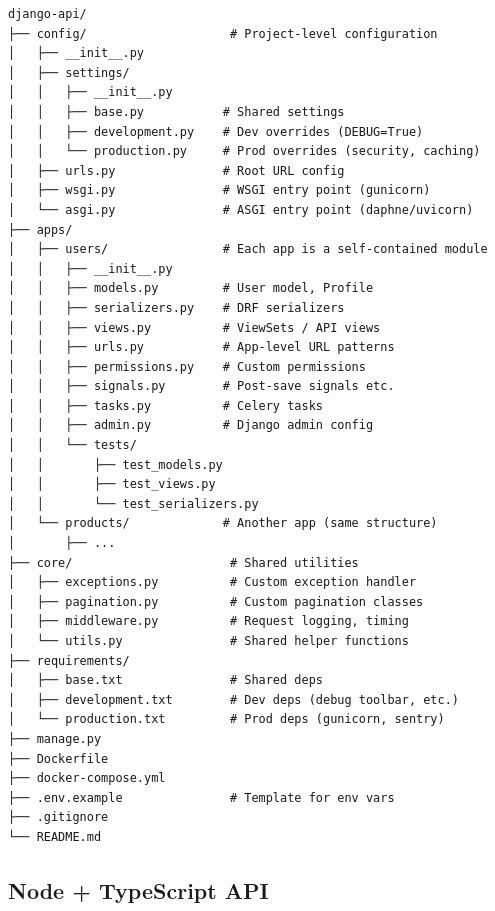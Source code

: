 \documentclass[10pt, a4paper]{article}
\begin{document}
\begin{lstlisting}
django-api/
├── config/                    # Project-level configuration
│   ├── __init__.py
│   ├── settings/
│   │   ├── __init__.py
│   │   ├── base.py           # Shared settings
│   │   ├── development.py    # Dev overrides (DEBUG=True)
│   │   └── production.py     # Prod overrides (security, caching)
│   ├── urls.py               # Root URL config
│   ├── wsgi.py               # WSGI entry point (gunicorn)
│   └── asgi.py               # ASGI entry point (daphne/uvicorn)
├── apps/
│   ├── users/                # Each app is a self-contained module
│   │   ├── __init__.py
│   │   ├── models.py         # User model, Profile
│   │   ├── serializers.py    # DRF serializers
│   │   ├── views.py          # ViewSets / API views
│   │   ├── urls.py           # App-level URL patterns
│   │   ├── permissions.py    # Custom permissions
│   │   ├── signals.py        # Post-save signals etc.
│   │   ├── tasks.py          # Celery tasks
│   │   ├── admin.py          # Django admin config
│   │   └── tests/
│   │       ├── test_models.py
│   │       ├── test_views.py
│   │       └── test_serializers.py
│   └── products/             # Another app (same structure)
│       ├── ...
├── core/                      # Shared utilities
│   ├── exceptions.py          # Custom exception handler
│   ├── pagination.py          # Custom pagination classes
│   ├── middleware.py          # Request logging, timing
│   └── utils.py               # Shared helper functions
├── requirements/
│   ├── base.txt               # Shared deps
│   ├── development.txt        # Dev deps (debug toolbar, etc.)
│   └── production.txt         # Prod deps (gunicorn, sentry)
├── manage.py
├── Dockerfile
├── docker-compose.yml
├── .env.example               # Template for env vars
├── .gitignore
└── README.md
\end{lstlisting}


\subsection{Node + TypeScript API}
\end{document}
